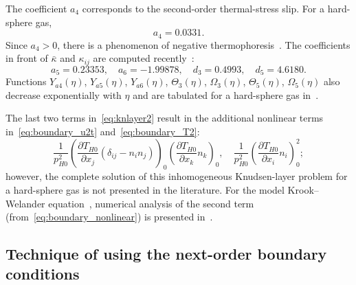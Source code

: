 \documentclass[10pt]{article}
\newcommand{\pder}[2][]{\frac{\partial#1}{\partial#2}}
\newcommand{\deltann}[2]{(\delta_{#1#2}-n_#1 n_#2)}
\newcommand{\onwall}[1]{\left(#1\right)_0}
\begin{document}
The coefficient \(a_4\) corresponds to the second-order thermal-stress slip.
For a hard-sphere gas,~\cite{Ohwada1992, Takata2015}
\begin{equation}\label{eq:a4_coeff}
    a_4 = 0.0331.
\end{equation}
Since \(a_4>0\), there is a phenomenon of negative thermophoresis~\cite{Ohwada1992}.
The coefficients in front of \(\bar\kappa\) and \(\kappa_{ij}\)
are computed recently~\cite{Takata2015curvature, Takata2015}:
\begin{equation}\label{eq:curvature_coeffs}
    a_5 = 0.23353, \quad a_6 = -1.99878, \quad d_3 = 0.4993, \quad d_5 = 4.6180.
\end{equation}
Functions \(Y_{a4}(\eta)\), \(Y_{a5}(\eta)\), \(Y_{a6}(\eta)\), \(\Theta_3(\eta)\),
\(\Omega_3(\eta)\), \(\Theta_5(\eta)\), \(\Omega_5(\eta)\) also decrease exponentially with \(\eta\)
and are tabulated for a hard-sphere gas in~\cite{Ohwada1992, Sone2002, Sone2007, Takata2015curvature, Takata2015}.

The last two terms in~\eqref{eq:knlayer2} result in the additional nonlinear terms
in~\eqref{eq:boundary_u2t} and~\eqref{eq:boundary_T2}:
\begin{equation}\label{eq:boundary_nonlinear}
    \frac1{p_{H0}^2}\onwall{\pder[T_{H0}]{x_j}\deltann{i}{j}}\onwall{\pder[T_{H0}]{x_k}n_k}, \quad
    \frac1{p_{H0}^2}\onwall{\pder[T_{H0}]{x_i}n_i}^2;
\end{equation}
however, the complete solution of this inhomogeneous Knudsen-layer problem
for a hard-sphere gas is not presented in the literature.
For the model Krook--Welander equation~\cite{Krook1954, Welander1954},
numerical analysis of the second term (from~\eqref{eq:boundary_nonlinear}) is presented in~\cite{Sone1970}.

\subsection{Technique of using the next-order boundary conditions}
\end{document}
